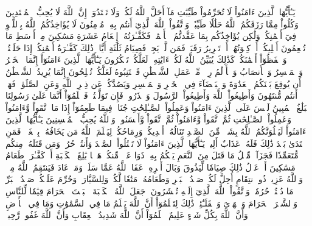 يَـٰٓأَيُّهَا ٱلَّذِينَ ءَامَنُواْ لَا تُحَرِّمُواْ طَيِّبَٰتِ مَآ أَحَلَّ ٱللَّهُ لَكُمۡ وَلَا تَعۡتَدُوٓاْۚ إِنَّ ٱللَّهَ لَا يُحِبُّ ٱلۡمُعۡتَدِينَ
وَكُلُواْ مِمَّا رَزَقَكُمُ ٱللَّهُ حَلَٰلٗا طَيِّبٗاۚ وَٱتَّقُواْ ٱللَّهَ ٱلَّذِيٓ أَنتُم بِهِۦ مُؤۡمِنُونَ
لَا يُؤَاخِذُكُمُ ٱللَّهُ بِٱللَّغۡوِ فِيٓ أَيۡمَٰنِكُمۡ وَلَٰكِن يُؤَاخِذُكُم بِمَا عَقَّدتُّمُ ٱلۡأَيۡمَٰنَۖ فَكَفَّـٰرَتُهُۥٓ إِطۡعَامُ عَشَرَةِ مَسَٰكِينَ مِنۡ أَوۡسَطِ مَا تُطۡعِمُونَ أَهۡلِيكُمۡ أَوۡ كِسۡوَتُهُمۡ أَوۡ تَحۡرِيرُ رَقَبَةٖۖ فَمَن لَّمۡ يَجِدۡ فَصِيَامُ ثَلَٰثَةِ أَيَّامٖۚ ذَٰلِكَ كَفَّـٰرَةُ أَيۡمَٰنِكُمۡ إِذَا حَلَفۡتُمۡۚ وَٱحۡفَظُوٓاْ أَيۡمَٰنَكُمۡۚ كَذَٰلِكَ يُبَيِّنُ ٱللَّهُ لَكُمۡ ءَايَٰتِهِۦ لَعَلَّكُمۡ تَشۡكُرُونَ
يَـٰٓأَيُّهَا ٱلَّذِينَ ءَامَنُوٓاْ إِنَّمَا ٱلۡخَمۡرُ وَٱلۡمَيۡسِرُ وَٱلۡأَنصَابُ وَٱلۡأَزۡلَٰمُ رِجۡسٞ مِّنۡ عَمَلِ ٱلشَّيۡطَٰنِ فَٱجۡتَنِبُوهُ لَعَلَّكُمۡ تُفۡلِحُونَ
إِنَّمَا يُرِيدُ ٱلشَّيۡطَٰنُ أَن يُوقِعَ بَيۡنَكُمُ ٱلۡعَدَٰوَةَ وَٱلۡبَغۡضَآءَ فِي ٱلۡخَمۡرِ وَٱلۡمَيۡسِرِ وَيَصُدَّكُمۡ عَن ذِكۡرِ ٱللَّهِ وَعَنِ ٱلصَّلَوٰةِۖ فَهَلۡ أَنتُم مُّنتَهُونَ
وَأَطِيعُواْ ٱللَّهَ وَأَطِيعُواْ ٱلرَّسُولَ وَٱحۡذَرُواْۚ فَإِن تَوَلَّيۡتُمۡ فَٱعۡلَمُوٓاْ أَنَّمَا عَلَىٰ رَسُولِنَا ٱلۡبَلَٰغُ ٱلۡمُبِينُ
لَيۡسَ عَلَى ٱلَّذِينَ ءَامَنُواْ وَعَمِلُواْ ٱلصَّـٰلِحَٰتِ جُنَاحٞ فِيمَا طَعِمُوٓاْ إِذَا مَا ٱتَّقَواْ وَّءَامَنُواْ وَعَمِلُواْ ٱلصَّـٰلِحَٰتِ ثُمَّ ٱتَّقَواْ وَّءَامَنُواْ ثُمَّ ٱتَّقَواْ وَّأَحۡسَنُواْۚ وَٱللَّهُ يُحِبُّ ٱلۡمُحۡسِنِينَ
يَـٰٓأَيُّهَا ٱلَّذِينَ ءَامَنُواْ لَيَبۡلُوَنَّكُمُ ٱللَّهُ بِشَيۡءٖ مِّنَ ٱلصَّيۡدِ تَنَالُهُۥٓ أَيۡدِيكُمۡ وَرِمَاحُكُمۡ لِيَعۡلَمَ ٱللَّهُ مَن يَخَافُهُۥ بِٱلۡغَيۡبِۚ فَمَنِ ٱعۡتَدَىٰ بَعۡدَ ذَٰلِكَ فَلَهُۥ عَذَابٌ أَلِيمٞ
يَـٰٓأَيُّهَا ٱلَّذِينَ ءَامَنُواْ لَا تَقۡتُلُواْ ٱلصَّيۡدَ وَأَنتُمۡ حُرُمٞۚ وَمَن قَتَلَهُۥ مِنكُم مُّتَعَمِّدٗا فَجَزَآءٞ مِّثۡلُ مَا قَتَلَ مِنَ ٱلنَّعَمِ يَحۡكُمُ بِهِۦ ذَوَا عَدۡلٖ مِّنكُمۡ هَدۡيَۢا بَٰلِغَ ٱلۡكَعۡبَةِ أَوۡ كَفَّـٰرَةٞ طَعَامُ مَسَٰكِينَ أَوۡ عَدۡلُ ذَٰلِكَ صِيَامٗا لِّيَذُوقَ وَبَالَ أَمۡرِهِۦۗ عَفَا ٱللَّهُ عَمَّا سَلَفَۚ وَمَنۡ عَادَ فَيَنتَقِمُ ٱللَّهُ مِنۡهُۚ وَٱللَّهُ عَزِيزٞ ذُو ٱنتِقَامٍ
أُحِلَّ لَكُمۡ صَيۡدُ ٱلۡبَحۡرِ وَطَعَامُهُۥ مَتَٰعٗا لَّكُمۡ وَلِلسَّيَّارَةِۖ وَحُرِّمَ عَلَيۡكُمۡ صَيۡدُ ٱلۡبَرِّ مَا دُمۡتُمۡ حُرُمٗاۗ وَٱتَّقُواْ ٱللَّهَ ٱلَّذِيٓ إِلَيۡهِ تُحۡشَرُونَ
۞جَعَلَ ٱللَّهُ ٱلۡكَعۡبَةَ ٱلۡبَيۡتَ ٱلۡحَرَامَ قِيَٰمٗا لِّلنَّاسِ وَٱلشَّهۡرَ ٱلۡحَرَامَ وَٱلۡهَدۡيَ وَٱلۡقَلَـٰٓئِدَۚ ذَٰلِكَ لِتَعۡلَمُوٓاْ أَنَّ ٱللَّهَ يَعۡلَمُ مَا فِي ٱلسَّمَٰوَٰتِ وَمَا فِي ٱلۡأَرۡضِ وَأَنَّ ٱللَّهَ بِكُلِّ شَيۡءٍ عَلِيمٌ
ٱعۡلَمُوٓاْ أَنَّ ٱللَّهَ شَدِيدُ ٱلۡعِقَابِ وَأَنَّ ٱللَّهَ غَفُورٞ رَّحِيمٞ
